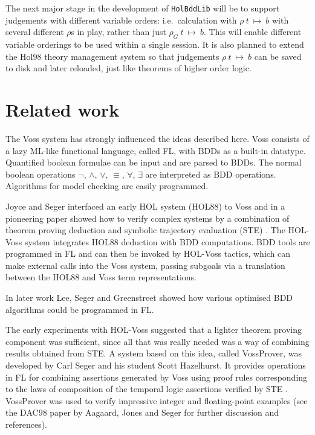 \documentclass[12pt]{article}
\newcommand{\ml}[1]{{\tt #1}}
\newcommand{\termbdd}[3]{\mbox{$#1~#2~\mapsto~#3$}}
\newcommand\Hol{Hol98\xspace}
\begin{document}
The next major stage in the development of \ml{HolBddLib} will be to
support judgements with different variable orders: i.e.~calculation
with $\termbdd{\rho}{t}{b}$ with several different $\rho$s in play,
rather than just $\termbdd{\rho_G}{t}{b}$. This will enable different
variable orderings to be used within a single session. It is also
planned to extend the \Hol{} theory management system so that
judgements $\termbdd{\rho}{t}{b}$ can be saved to disk and later
reloaded, just like theorems of higher order logic.

\section{Related work}\label{related}

The Voss system \cite{SegerVoss} has strongly influenced
the ideas described here. Voss consists of a lazy
ML-like functional language, called FL, with BDDs as a built-in datatype.
Quantified boolean formulae can be input and are parsed to BDDs.
The normal boolean operations $\neg$, $\wedge$, $\vee$, $\equiv$,
$\forall$, $\exists$ are interpreted as BDD operations.  
Algorithms for model checking are easily programmed.

Joyce and Seger interfaced an early HOL system (HOL88) to Voss and in
a pioneering paper showed how to verify complex systems by a
combination of theorem proving deduction and symbolic trajectory
evaluation (STE) \cite{JoyceSeger}. The HOL-Voss system integrates HOL88
deduction with BDD computations.  BDD tools are programmed in FL and
can then be invoked by HOL-Voss tactics, which can make external
calls into the Voss system, passing subgoals via a translation between
the HOL88 and Voss term representations.

In later work Lee, Seger and Greenstreet \cite{LeeGreenstreetSeger}
showed how various optimised BDD algorithms could be programmed in FL.

The early experiments with HOL-Voss suggested that a lighter theorem
proving component was sufficient, since all that was really needed was
a way of combining results obtained from STE. A system based on this
idea, called VossProver, was developed by Carl Seger and his student
Scott Hazelhurst. It provides operations in FL for combining
assertions generated by Voss using proof rules corresponding to the
laws of composition of the temporal logic assertions verified by STE
\cite{hazelhurst-kropfbook-97}.  
VossProver was used to verify
impressive integer and floating-point examples (see the DAC98
paper by Aagaard, Jones and Seger \cite{aagaard-dac-98} for further
discussion and references). 
\end{document}
